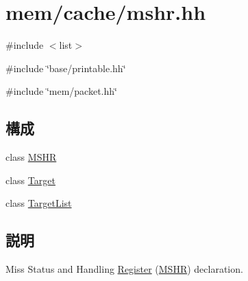 \hypertarget{mshr_8hh}{
\section{mem/cache/mshr.hh}
\label{mshr_8hh}
}
{\ttfamily \#include $<$list$>$}\par
{\ttfamily \#include \char`\"{}base/printable.hh\char`\"{}}\par
{\ttfamily \#include \char`\"{}mem/packet.hh\char`\"{}}\par
\subsection*{構成}
\begin{DoxyCompactItemize}
\item 
class \hyperlink{classMSHR}{MSHR}
\item 
class \hyperlink{classMSHR_1_1Target}{Target}
\item 
class \hyperlink{classMSHR_1_1TargetList}{TargetList}
\end{DoxyCompactItemize}


\subsection{説明}
Miss Status and Handling \hyperlink{classRegister}{Register} (\hyperlink{classMSHR}{MSHR}) declaration. 